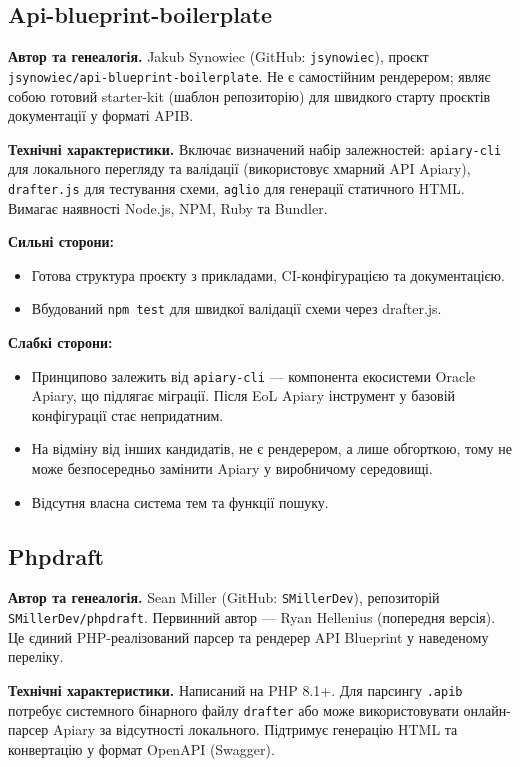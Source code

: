 \documentclass{article}
\begin{document}
\subsection{Api-blueprint-boilerplate}
\textbf{Автор та генеалогія.} Jakub Synowiec (GitHub: \texttt{jsynowiec}), проєкт \texttt{jsynowiec/api-blueprint-boilerplate}. Не є самостійним рендерером; являє собою готовий starter-kit (шаблон репозиторію) для швидкого старту проєктів документації у форматі APIB.

\textbf{Технічні характеристики.} Включає визначений набір залежностей: \texttt{apiary-cli} для локального перегляду та валідації (використовує хмарний API Apiary), \texttt{drafter.js} для тестування схеми, \texttt{aglio} для генерації статичного HTML. Вимагає наявності Node.js, NPM, Ruby та Bundler.

\textbf{Сильні сторони:}
\begin{itemize}
\item Готова структура проєкту з прикладами, CI-конфігурацією та документацією.
\item Вбудований \texttt{npm test} для швидкої валідації схеми через drafter.js.
\end{itemize}

\textbf{Слабкі сторони:}
\begin{itemize}
\item Принципово залежить від \texttt{apiary-cli} — компонента екосистеми Oracle Apiary, що підлягає міграції. Після EoL Apiary інструмент у базовій конфігурації стає непридатним.
\item На відміну від інших кандидатів, не є рендерером, а лише обгорткою, тому не може безпосередньо замінити Apiary у виробничому середовищі.
\item Відсутня власна система тем та функції пошуку.
\end{itemize}

\subsection{Phpdraft}
\textbf{Автор та генеалогія.} Sean Miller (GitHub: \texttt{SMillerDev}), репозиторій \texttt{SMillerDev/phpdraft}. Первинний автор — Ryan Hellenius (попередня версія). Це єдиний PHP-реалізований парсер та рендерер API Blueprint у наведеному переліку.

\textbf{Технічні характеристики.} Написаний на PHP 8.1+. Для парсингу \texttt{.apib} потребує системного бінарного файлу \texttt{drafter} або може використовувати онлайн-парсер Apiary за відсутності локального. Підтримує генерацію HTML та конвертацію у формат OpenAPI (Swagger).
\end{document}
